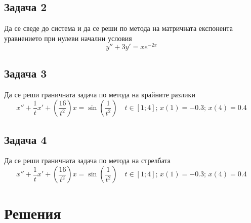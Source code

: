 \documentclass[a4paper,fleqn,12pt]{article}
\begin{document}
\subsection{Задача 2}
Да се сведе до система и да се реши по метода на матричната експонента уравнението при нулеви начални условия
	\begin{equation}
	y''+3y'=xe^{-2x}
	\end{equation}

\subsection{Задача 3}
Да се реши граничната задача по метода на крайните разлики
	\begin{equation}
	x'' + \frac{1}{t} x' + \left( \frac{16}{t^2}\right) x = \sin \left( \frac{1}{t^2}\right) \quad t \in [1;4]; \, x(1) = -0.3 ; \, x(4) = 0.4
	\end{equation}

\subsection{Задача 4}
Да се реши граничната задача по метода на стрелбата
	\begin{equation}
	x'' + \frac{1}{t} x' + \left( \frac{16}{t^2}\right) x = \sin \left( \frac{1}{t^2}\right) \quad t \in [1;4]; \, x(1) = -0.3 ; \, x(4) = 0.4
	\end{equation}

\newpage
\section{Решения}
\end{document}
